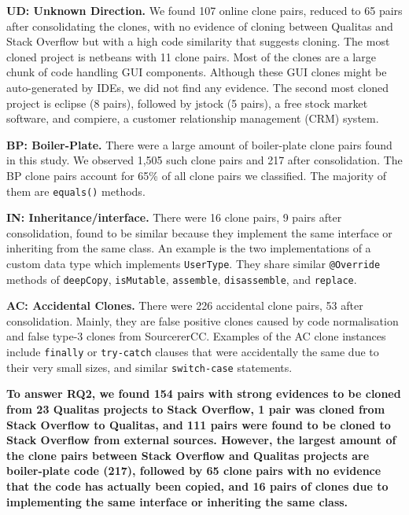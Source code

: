 \documentclass[10pt,journal,compsoc]{IEEEtran}
\begin{document}

\textbf{UD: Unknown Direction.} We found 107 online clone pairs, reduced to 65
pairs after consolidating the clones, with no evidence of cloning between Qualitas
and Stack Overflow but with a high code similarity that suggests cloning. 
The most cloned project is \textsf{netbeans} with 11 clone pairs. Most of the
clones are a large chunk of code handling GUI components. Although these GUI
clones might be auto-generated by IDEs, we did not find any evidence. The second
most cloned project is \textsf{eclipse} (8 pairs), followed by
\textsf{jstock}  (5 pairs),
a free stock market software, and \textsf{compiere}, a customer
relationship management (CRM) system.

\textbf{BP: Boiler-Plate.} There were a large amount of boiler-plate clone pairs
found in this study. We observed 1,505 such clone pairs and 217 after
consolidation. The BP clone pairs account for 65\% of all clone pairs we
classified. The majority of them are {\small{\texttt{equals()}}} methods.

\textbf{IN: Inheritance/interface.} There were 16 clone pairs, 9 pairs after
consolidation, found to be similar because they implement the same interface or
inheriting from the same class. An example is the two implementations of a
custom data type which implements {\small\texttt{UserType}}. They share similar
{\small\texttt{@Override}} methods of {\small\texttt{deepCopy}},
{\small\texttt{isMutable}}, {\small\texttt{assemble}},
{\small\texttt{disassemble}}, and {\small\texttt{replace}}.

\textbf{AC: Accidental Clones.} There were 226 accidental clone
pairs, 53 after consolidation. Mainly, they are false positive clones caused by code
normalisation and false type-3 clones from SourcererCC. 
Examples of the AC clone instances include {\small\texttt{finally}} or
{\small\texttt{try-catch}} clauses that were accidentally the same due
to their very small sizes, and similar {\small\texttt{switch-case}}
statements.

\textbf{To answer RQ2, we found 154 pairs with
	strong evidences to be cloned from 23 Qualitas projects to Stack Overflow, 1 pair
	was cloned from Stack Overflow to Qualitas, and
	111 pairs were found to be cloned to Stack Overflow from external
	sources. However, the largest amount of the clone pairs
	between Stack Overflow and Qualitas projects are \linebreak boiler-plate code
	(217), followed by 65 clone pairs with no evidence that the code has actually been copied,
	and 16 pairs of clones due to implementing the same interface or inheriting the same class.} 
\end{document}
